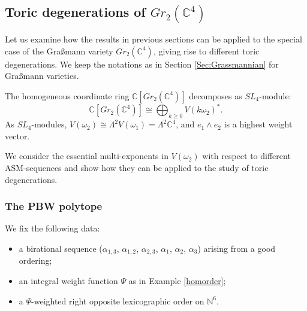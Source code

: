 \documentclass{emsprocart}
\theoremstyle{definition}
\begin{document}
\subsection{Toric degenerations of \texorpdfstring{$Gr_{2}(\mathbb C^4)$}{Gra\ss mannian of planes}}\label{gtwofour}

Let us examine how the results in previous sections can be applied to the special case of the Gra\ss mann variety $Gr_{2}(\mathbb C^4)$, 
giving rise to different toric degenerations. We keep the notations as in Section \ref{Sec:Grassmannian} for Gra{\ss}mann varieties.
\par
The homogeneous coordinate ring $\mathbb{C}[Gr_{2}(\mathbb C^4)]$ decomposes as $SL_4$-module:
$$\mathbb{C}[Gr_{2}(\mathbb C^4)]\cong \bigoplus_{k\geq 0}V(k\omega_2)^*.$$
As $SL_4$-modules, $V(\omega_2)\cong \Lambda^2 V(\omega_1)=\Lambda^2 \mathbb{C}^4$, and $e_1\wedge e_2$ is a highest weight vector.
\par
We consider the essential multi-exponents in $V(\omega_2)$ with respect to different ASM-sequences and show how they can be applied to the study of toric degenerations.

\subsubsection{The PBW polytope}
We fix the following data:
\begin{itemize}
\item a birational sequence ($\alpha_{1,3}$, $\alpha_{1,2}$, $\alpha_{2,3}$, $\alpha_1$, $\alpha_2$, $\alpha_3$) arising from a good ordering;
\item an integral weight function $\Psi$ as in Example \ref{homorder};
\item a $\Psi$-weighted right opposite lexicographic order on $\mathbb{N}^6$.
\end{itemize}
\end{document}
